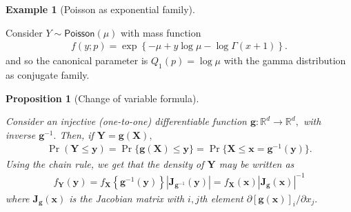 \documentclass[
  11pt,
  letterpaper,
]{scrbook}
\theoremstyle{definition}
\theoremstyle{plain}
\theoremstyle{plain}
\newtheorem{proposition}{Proposition}[chapter]
\theoremstyle{definition}
\theoremstyle{definition}
\newtheorem{example}{Example}[chapter]
\theoremstyle{remark}
\begin{document}
\begin{example}[Poisson as exponential
family]\protect\hypertarget{exm-exponential-family-poisson}{}\label{exm-exponential-family-poisson}

Consider \(Y \sim \mathsf{Poisson}(\mu)\) with mass function
\begin{align*}
f(y; p)=\exp \left\{ - \mu + y \log \mu - \log \Gamma(x+1)\right\}.
\end{align*} and so the canonical parameter is \(Q_1(p) = \log \mu\)
with the gamma distribution as conjugate family.

\end{example}

\begin{proposition}[Change of variable
formula]\protect\hypertarget{prp-change-variable}{}\label{prp-change-variable}

Consider an injective (one-to-one) differentiable function
\(\boldsymbol{g}: \mathbb{R}^d \to \mathbb{R}^d,\) with inverse
\(\boldsymbol{g}^{-1}.\) Then, if
\(\boldsymbol{Y}=\boldsymbol{g}(\boldsymbol{X}),\) \begin{align*}
\Pr(\boldsymbol{Y} \leq \boldsymbol{y}) = \Pr\{\boldsymbol{g}(\boldsymbol{X}) \leq \boldsymbol{y}\} = \Pr\{\boldsymbol{X} \leq \boldsymbol{x} = \boldsymbol{g}^{-1}(\boldsymbol{y})\}.
\end{align*} Using the chain rule, we get that the density of
\(\boldsymbol{Y}\) may be written as \begin{align*}
f_{\boldsymbol{Y}}(\boldsymbol{y}) = f_{\boldsymbol{X}}\left\{\boldsymbol{g}^{-1}(\boldsymbol{y})\right\} \left| \mathbf{J}_{\boldsymbol{g}^{-1}}(\boldsymbol{y})\right| = f_{\boldsymbol{X}}(\boldsymbol{x}) \left| \mathbf{J}_{\boldsymbol{g}}(\boldsymbol{x})\right|^{-1}
\end{align*} where \(\mathbf{J}_{\boldsymbol{g}}(\boldsymbol{x})\) is
the Jacobian matrix with \(i,j\)th element
\(\partial [\boldsymbol{g}(\boldsymbol{x})]_i / \partial x_j.\)

\end{proposition}
\end{document}
